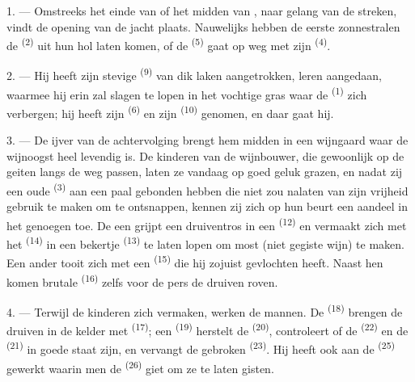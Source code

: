 \VUsaut{6.0mm}
\VUsaut{3.6mm}

\VUsaut{1.4mm}
\VUsaut{4.0mm}

1. --- Omstreeks het einde van  of het midden van
, naar gelang van de streken, vindt de opening van de jacht
plaats. Nauwelijks hebben de eerste zonnestralen de  \textsuperscript{(2)}
uit hun hol laten komen, of de  \textsuperscript{(5)} gaat op weg met zijn
 \textsuperscript{(4)}.

2. --- Hij heeft zijn stevige  \textsuperscript{(9)} van dik laken
aangetrokken, leren  aangedaan, waarmee hij erin zal slagen te lopen in het
vochtige gras waar de  \textsuperscript{(1)} zich verbergen; hij heeft zijn
 \textsuperscript{(6)} en zijn  \textsuperscript{(10)} genomen,
en daar gaat hij.

3. --- De ijver van de achtervolging brengt hem midden in een wijngaard waar de wijnoogst heel
levendig is. De kinderen van de wijnbouwer, die gewoonlijk op de geiten langs de weg passen,
laten ze vandaag op goed geluk grazen, en nadat zij een oude 
\textsuperscript{(3)} aan een paal gebonden hebben die niet zou nalaten van zijn vrijheid
gebruik te maken om te ontsnappen, kennen zij zich op hun beurt een aandeel in het genoegen
toe. De een grijpt een druiventros in een  \textsuperscript{(12)} en
vermaakt zich met het
 \textsuperscript{(14)} in een bekertje \textsuperscript{(13)} te
laten lopen om most (niet gegiste wijn) te maken. Een ander tooit zich met een
 \textsuperscript{(15)} die hij zojuist gevlochten heeft.
Naast hen komen brutale  \textsuperscript{(16)} zelfs voor de pers de druiven
roven.

4. --- Terwijl de kinderen zich vermaken, werken de mannen. De
 \textsuperscript{(18)} brengen de druiven in de kelder met
 \textsuperscript{(17)}; een 
\textsuperscript{(19)} herstelt de  \textsuperscript{(20)}, controleert of de
 \textsuperscript{(22)} en de
 \textsuperscript{(21)} in goede staat zijn, en vervangt de
gebroken  \textsuperscript{(23)}. Hij heeft ook aan de
 \textsuperscript{(25)} gewerkt waarin men de 
\textsuperscript{(26)} giet om ze te laten gisten.

